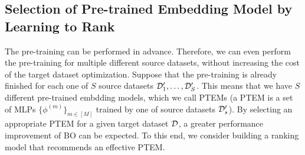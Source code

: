 \subsection{Selection of Pre-trained Embedding Model by Learning to Rank}
\label{ssec:ranking-model}


The pre-training can be performed in advance.
Therefore, we can even perform the pre-training for multiple different source datasets, without increasing the cost of the target dataset optimization. 
%
Suppose that the pre-training is already finished for each one of $S$ source datasets ${\mathcal D}_1^\prime, \ldots, {\mathcal D}_S^\prime$.
%
This means that we have $S$ different pre-trained embdding models, which we call PTEMs (a PTEM is a set of MLPs $\{ \phi^{(m)} \}_{m \in [M]}$ trained by one of source datasets ${\mathcal D}^\prime_s$). 
%
By selecting an appropriate PTEM for a given target dataset ${\mathcal D}$, a greater performance improvement of BO can be expected.
To this end, we consider building a ranking model that recommends an effective PTEM.


